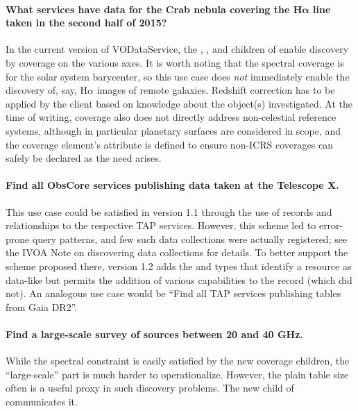 \documentclass[11pt,a4paper]{ivoa}
\begin{document}
\paragraph{What services have data for the Crab nebula covering the
H$\boldsymbol\alpha$
line taken in the second half of 2015?}  In the current
version of VODataService,
the , , and 
children of  enable discovery by coverage on the various
axes.  It is worth noting that the spectral coverage is for the solar
system barycenter, so this use case does \emph{not} immediately enable
the discovery of, say, H$\alpha$ images of remote galaxies.  Redshift
correction has to be applied by the client based on knowledge about the
object(s) investigated.  At the time of writing, coverage also does not
directly address non-celestial reference systems, although in particular
planetary surfaces are considered in scope, and the coverage element's
 attribute is defined to ensure non-ICRS coverages can
safely be declared as the need arises.

\paragraph{Find all ObsCore services publishing data taken at the
Telescope X.} This use case could be satisfied in version 1.1 through
the use of  records and relationships to the
respective TAP services.  However, this scheme led to error-prone query
patterns, and few such data collections were actually registered; see
the IVOA Note on discovering data collections \citep{2019ivoa.spec.0520D} for
details.  To better support the scheme proposed there, version 1.2 adds
the  and  types
that identify a resource as data-like but
permits the addition of various capabilities to the record (which
 did not).  An analogous use case would be
``Find all TAP services publishing tables from Gaia DR2''.

\paragraph{Find a large-scale survey of sources between 20 and 40 GHz.}
While the spectral constraint is easily satisfied by the new coverage
children, the ``large-scale'' part is much harder to operationalize.
However, the plain table size often is a useful proxy in such discovery
problems.  The new  child of  communicates
it.
\end{document}
